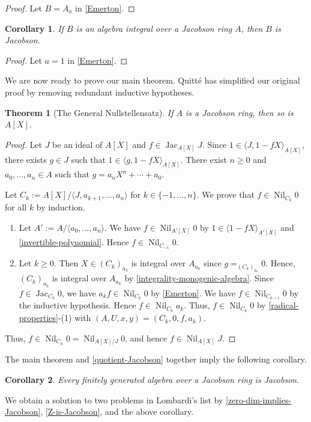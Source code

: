 \documentclass[11pt]{article}
\newtheorem{theorem}{Theorem}[section]
\newtheorem{corollary}{Corollary}[section]
\theoremstyle{definition}
\newcommand\gen[1]{\langle{#1}\rangle}
\DeclareMathOperator{\Nil}{Nil}
\DeclareMathOperator{\Jac}{Jac}
\begin{document}
\begin{proof}
    Let $B=A_a$ in \cref{Emerton}.
\end{proof}
\begin{corollary}
    If $B$ is an algebra integral over a Jacobson ring $A$, then $B$ is Jacobson.
\end{corollary}
\begin{proof}
    Let $a=1$ in \cref{Emerton}.
\end{proof}
We are now ready to prove our main theorem.
Quitté \cite{Qui24} has simplified our original proof by removing redundant inductive hypotheses.
\begin{theorem}[The General Nullstellensatz]\label{general-nullstellensatz}
    If $A$ is a Jacobson ring, then so is $A[X]$.
\end{theorem}
\begin{proof}
    Let $J$ be an ideal of $A[X]$ and $f\in\Jac_{A[X]}J$.
    Since $1\in\gen{J,1-fX}_{A[X]}$, there exists $g\in J$ such that $1\in\gen{g,1-fX}_{A[X]}$.
    There exist $n\ge0$ and $a_0,\ldots,a_n\in A$ such that $g=a_nX^n+\cdots+a_0$.

    Let $C_k:=A[X]/\gen{J,a_{k+1},\ldots,a_n}$ for $k\in\{-1,\ldots,n\}$.
    We prove that $f\in\Nil_{C_k}0$ for all $k$ by induction.
    \begin{enumerate}
        \item Let $A':=A/\gen{a_0,\ldots,a_n}$. We have $f\in\Nil_{A'[X]}0$ by $1\in\gen{1-fX}_{A'[X]}$ and \cref{invertible-polynomial}. Hence $f\in\Nil_{C_{-1}}0$.
        \item Let $k\ge0$. 
        Then $X\in (C_k)_{a_k}$ is integral over $A_{a_k}$ since $g=_{(C_k)_{a_k}}0$.
        Hence, $(C_k)_{a_k}$ is integral over $A_{a_k}$ by \cref{integrality-monogenic-algebra}. Since $f\in\Jac_{C_k}0$, we have $a_kf\in\Nil_{C_k}0$ by \cref{Emerton}.
        We have $f\in\Nil_{C_{k-1}}0$ by the inductive hypothesis. Hence $f\in\Nil_{C_{k}}a_k$. Thus, $f\in\Nil_{C_k}0$ by \cref{radical-properties}-(1) with $(A,U,x,y)=(C_k,0,f,a_k)$.
    \end{enumerate}
    Thus, $f\in\Nil_{C_n}0=\Nil_{A[X]/J}0$, and hence $f\in\Nil_{A[X]}J$.
\end{proof}
The main theorem and \cref{quotient-Jacobson} together imply the following corollary.
\begin{corollary}\label{fg-Jacobson}
    Every finitely generated algebra over a Jacobson ring is Jacobson.
\end{corollary}
We obtain a solution to two problems \cite[{}1.1, 1.2]{Lom23} in Lombardi's list by \cref{zero-dim-implies-Jacobson}, \cref{Z-is-Jacobson}, and the above corollary.
\end{document}
